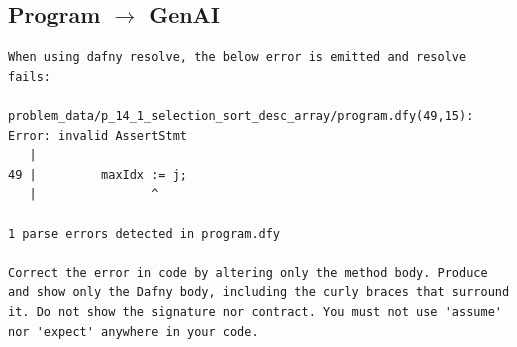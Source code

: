 \documentclass{article}
\begin{document}
\subsection*{Program $\rightarrow$ GenAI}
\begin{lstlisting}
When using dafny resolve, the below error is emitted and resolve fails:

problem_data/p_14_1_selection_sort_desc_array/program.dfy(49,15): Error: invalid AssertStmt
   |
49 |         maxIdx := j;
   |                ^

1 parse errors detected in program.dfy

Correct the error in code by altering only the method body. Produce and show only the Dafny body, including the curly braces that surround it. Do not show the signature nor contract. You must not use 'assume' nor 'expect' anywhere in your code.
\end{lstlisting}
\end{document}
